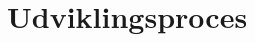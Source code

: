 \section{Udviklingsproces}

\begin{comment}
	
Webcam
	Varetager forbindelse til webcam
	Henter BufferedImage i 320x240

Processor
	Billede ind som BufferedImage
	Parse til 2D-array
	Filtrering
	Optimering i walker
	Objekt-/robot ID
	Obstacle map
	Grafisk repræsentation
	Scaling (ej i brug)
	Returnerer Locations objekt til brug i pathfinder
	
Udviklingsproces
	Simpelt udgangspunkt
	Løbende tilføjet funktionalitet med behov fra stifinding
	Efter første full cycle udviklet i version 2 med optimeringer
	
Test
	Program t visuel test
	"Webcam-simulator"
	Benchmark kørsler, resultater
	Performance udvikling
\end{comment}